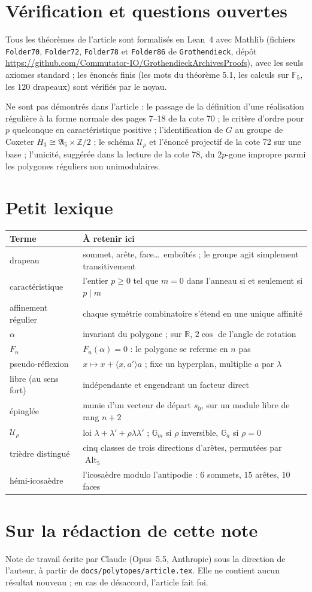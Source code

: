 \documentclass[11pt,a4paper]{amsart}
\theoremstyle{definition}
\theoremstyle{plain}
\theoremstyle{remark}
\newcommand{\Z}{\mathbb Z}
\newcommand{\F}{\mathbb F}
\newcommand{\R}{\mathbb R}
\newcommand{\Alt}{\operatorname{Alt}}
\begin{document}
\section{Vérification et questions ouvertes}

Tous les théorèmes de l'article sont formalisés en Lean~4 avec Mathlib (fichiers \texttt{Folder70}, \texttt{Folder72}, \texttt{Folder78} et \texttt{Folder86} de \texttt{Grothendieck}, dépôt \url{https://github.com/Commutator-IO/GrothendieckArchivesProofs}), avec les seuls axiomes standard ; les énoncés finis (les mots du théorème 5.1, les calculs sur $\F_5$, les $120$ drapeaux) sont vérifiés par le noyau.

Ne sont pas démontrés dans l'article : le passage de la définition d'une réalisation régulière à la forme normale des pages 7--18 de la cote 70 ; le critère d'ordre pour $p$ quelconque en caractéristique positive ; l'identification de $G$ au groupe de Coxeter $H_3 \cong \mathfrak A_5 \times \Z/2$ ; le schéma $\mathcal U_\rho$ et l'énoncé projectif de la cote 72 sur une base ; l'unicité, suggérée dans la lecture de la cote 78, du $2p$-gone impropre parmi les polygones réguliers non unimodulaires.

\section{Petit lexique}

{\small
\begin{tabular}{@{}p{3.6cm}p{10.2cm}@{}}
\toprule
Terme & À retenir ici \\
\midrule
drapeau & sommet, arête, face\dots\ emboîtés ; le groupe agit simplement transitivement \\
caractéristique & l'entier $p \ge 0$ tel que $m = 0$ dans l'anneau si et seulement si $p \mid m$ \\
affinement régulier & chaque symétrie combinatoire s'étend en une unique affinité \\
$\alpha$ & invariant du polygone ; sur $\R$, $2\cos$ de l'angle de rotation \\
$F_n$ & $F_n(\alpha) = 0$ : le polygone se referme en $n$ pas \\
pseudo-réflexion & $x \mapsto x + \langle x, a'\rangle a$ ; fixe un hyperplan, multiplie $a$ par $\lambda$ \\
libre (au sens fort) & indépendante et engendrant un facteur direct \\
épinglée & munie d'un vecteur de départ $s_0$, sur un module libre de rang $n+2$ \\
$\mathcal U_\rho$ & loi $\lambda + \lambda' + \rho\lambda\lambda'$ ; $\mathbb G_m$ si $\rho$ inversible, $\mathbb G_a$ si $\rho = 0$ \\
trièdre distingué & cinq classes de trois directions d'arêtes, permutées par $\Alt_5$ \\
hémi-icosaèdre & l'icosaèdre modulo l'antipodie : $6$ sommets, $15$ arêtes, $10$ faces \\
\bottomrule
\end{tabular}}

\section*{Sur la rédaction de cette note}

Note de travail écrite par Claude (Opus~5.5, Anthropic) sous la direction de l'auteur, à partir de \texttt{docs/polytopes/article.tex}. Elle ne contient aucun résultat nouveau ; en cas de désaccord, l'article fait foi.
\end{document}
